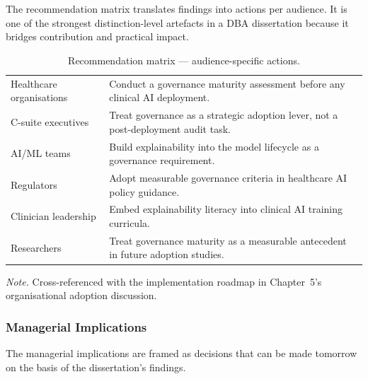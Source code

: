 \noindent The recommendation matrix translates findings into actions per audience. It is one of the strongest distinction-level artefacts in a DBA dissertation because it bridges contribution and practical impact.

{\tablestripes\tablefontsize
{}
\begin{xltabular}{\textwidth}{@{} >{\raggedright\arraybackslash}p{5cm} L @{}}
\caption[Recommendation matrix --- audience-specific actions]{Recommendation matrix --- audience-specific actions.}\label{tab:ch5_recommendation_matrix} \\
\toprule
{} &  \\
\midrule
\endfirsthead
\endhead
\bottomrule
\endlastfoot
Healthcare organisations & Conduct a governance maturity assessment before any clinical AI deployment. \\
\addlinespace
C-suite executives & Treat governance as a strategic adoption lever, not a post-deployment audit task. \\
\addlinespace
AI/ML teams & Build explainability into the model lifecycle as a governance requirement. \\
\addlinespace
Regulators & Adopt measurable governance criteria in healthcare AI policy guidance. \\
\addlinespace
Clinician leadership & Embed explainability literacy into clinical AI training curricula. \\
\addlinespace
Researchers & Treat governance maturity as a measurable antecedent in future adoption studies. \\
\end{xltabular}}

\vspace{0.3em}\noindent\textit{Note.} Cross-referenced with the implementation roadmap in Chapter~5's organisational adoption discussion.


\subsubsection{Managerial Implications}
\label{sec:ch5_managerial_implications}

\noindent The managerial implications are framed as decisions that can be made tomorrow on the basis of the dissertation's findings.


